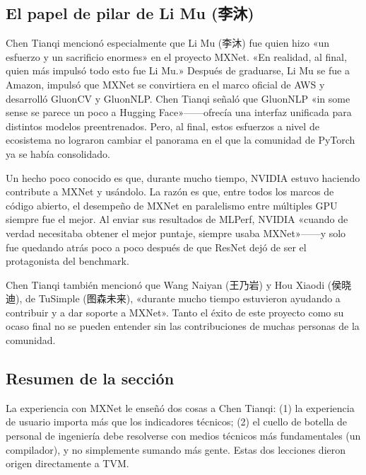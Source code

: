 \subsection{El papel de pilar de Li Mu (李沐)}

Chen Tianqi mencionó especialmente que Li Mu (李沐) fue quien hizo «un esfuerzo y un sacrificio enormes» en el proyecto MXNet. «En realidad, al final, quien más impulsó todo esto fue Li Mu.» Después de graduarse, Li Mu se fue a Amazon, impulsó que MXNet se convirtiera en el marco oficial de AWS y desarrolló GluonCV y GluonNLP. Chen Tianqi señaló que GluonNLP «in some sense se parece un poco a Hugging Face»------ofrecía una interfaz unificada para distintos modelos preentrenados. Pero, al final, estos esfuerzos a nivel de ecosistema no lograron cambiar el panorama en el que la comunidad de PyTorch ya se había consolidado.

Un hecho poco conocido es que, durante mucho tiempo, NVIDIA estuvo haciendo contribute a MXNet y usándolo. La razón es que, entre todos los marcos de código abierto, el desempeño de MXNet en paralelismo entre múltiples GPU siempre fue el mejor. Al enviar sus resultados de MLPerf, NVIDIA «cuando de verdad necesitaba obtener el mejor puntaje, siempre usaba MXNet»------y solo fue quedando atrás poco a poco después de que ResNet dejó de ser el protagonista del benchmark.

Chen Tianqi también mencionó que Wang Naiyan (王乃岩) y Hou Xiaodi (侯晓迪), de TuSimple (图森未来), «durante mucho tiempo estuvieron ayudando a contribuir y a dar soporte a MXNet». Tanto el éxito de este proyecto como su ocaso final no se pueden entender sin las contribuciones de muchas personas de la comunidad.

\subsection{Resumen de la sección}

La experiencia con MXNet le enseñó dos cosas a Chen Tianqi: (1) la experiencia de usuario importa más que los indicadores técnicos; (2) el cuello de botella de personal de ingeniería debe resolverse con medios técnicos más fundamentales (un compilador), y no simplemente sumando más gente. Estas dos lecciones dieron origen directamente a TVM.
